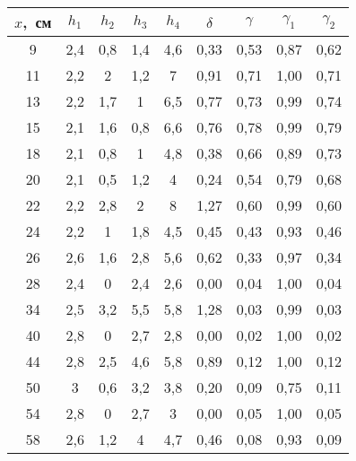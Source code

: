 \begin{tabular}{c|cccc|cccc} \toprule
$ x $,~см & $ h_1 $ & $ h_2 $ & $ h_3 $ & $ h_4 $ & $ \delta $ & $ \gamma $ & $ \gamma_1 $ & $ \gamma_2 $ \\ \midrule
9              & 2,4     & 0,8     & 1,4     & 4,6     & 0,33       & 0,53       & 0,87         & 0,62         \\
11             & 2,2     & 2       & 1,2     & 7       & 0,91       & 0,71       & 1,00         & 0,71         \\
13             & 2,2     & 1,7     & 1       & 6,5     & 0,77       & 0,73       & 0,99         & 0,74         \\
15             & 2,1     & 1,6     & 0,8     & 6,6     & 0,76       & 0,78       & 0,99         & 0,79         \\
18             & 2,1     & 0,8     & 1       & 4,8     & 0,38       & 0,66       & 0,89         & 0,73         \\
20             & 2,1     & 0,5     & 1,2     & 4       & 0,24       & 0,54       & 0,79         & 0,68         \\
22             & 2,2     & 2,8     & 2       & 8       & 1,27       & 0,60       & 0,99         & 0,60         \\
24             & 2,2     & 1       & 1,8     & 4,5     & 0,45       & 0,43       & 0,93         & 0,46         \\
26             & 2,6     & 1,6     & 2,8     & 5,6     & 0,62       & 0,33       & 0,97         & 0,34         \\
28             & 2,4     & 0       & 2,4     & 2,6     & 0,00       & 0,04       & 1,00         & 0,04         \\
34             & 2,5     & 3,2     & 5,5     & 5,8     & 1,28       & 0,03       & 0,99         & 0,03         \\
40             & 2,8     & 0       & 2,7     & 2,8     & 0,00       & 0,02       & 1,00         & 0,02         \\
44             & 2,8     & 2,5     & 4,6     & 5,8     & 0,89       & 0,12       & 1,00         & 0,12         \\
50             & 3       & 0,6     & 3,2     & 3,8     & 0,20       & 0,09       & 0,75         & 0,11         \\
54             & 2,8     & 0       & 2,7     & 3       & 0,00       & 0,05       & 1,00         & 0,05         \\
58             & 2,6     & 1,2     & 4       & 4,7     & 0,46       & 0,08       & 0,93         & 0,09         \\

\end{tabular}
